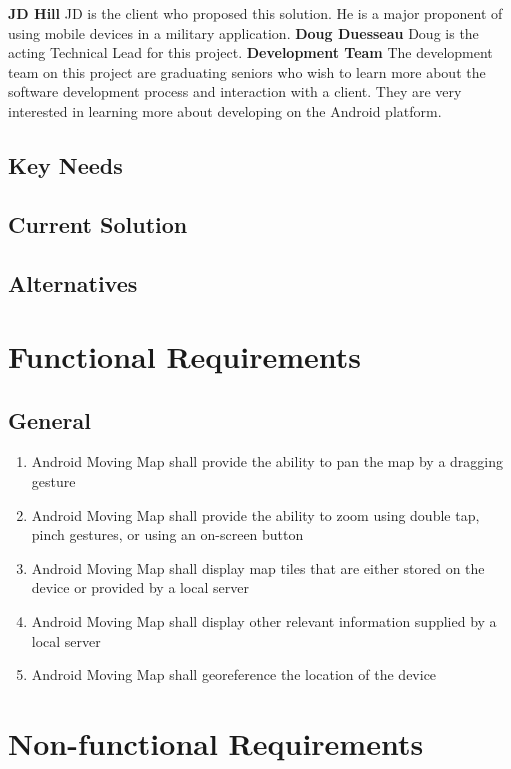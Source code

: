 \documentclass{article}
\begin{document}
\textbf{JD Hill}
JD is the client who proposed this solution.  He is a major proponent of using mobile devices in a military application.
\textbf{Doug Duesseau}
Doug is the acting Technical Lead for this project. 
\textbf{Development Team}
The development team on this project are graduating seniors who wish to learn more about the software development process and interaction with a client.  They are very interested in learning more about developing on the Android platform.

\subsection{Key Needs}
\subsection{Current Solution}
\subsection{Alternatives}


\section{Functional Requirements}

\subsection{General}

\begin{enumerate}[label*=3.1.\arabic*]
\item Android Moving Map shall provide the ability to pan the map by a dragging gesture
\item Android Moving Map shall provide the ability to zoom using double tap, pinch gestures, or using an on-screen button
\item Android Moving Map shall display map tiles that are either stored on the device or provided by a local server
\item Android Moving Map shall display other relevant information supplied by a local server
\item Android Moving Map shall georeference the location of the device
\end{enumerate}

\section{Non-functional Requirements}
\end{document}
